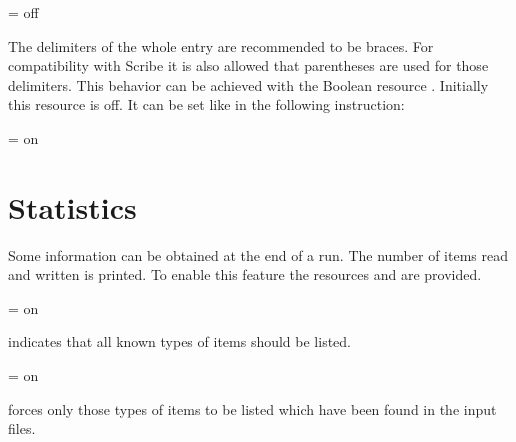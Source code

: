 \documentclass[11pt,a4paper]{scrbook}
\begin{document}
\begin{Resources}
   = off
\end{Resources}

The delimiters of the whole entry are recommended to be braces. For
compatibility with Scribe it is also allowed that parentheses are used for
those delimiters. This behavior can be achieved with the Boolean resource
. Initially this resource is off. It can be set like in
the following instruction:

\begin{Resources}
   = on
\end{Resources}


\begin{Summary}
\end{Summary}


\section{Statistics}

Some information can be obtained at the end of a \BibTool{} run. The number of
\BibTeX{} items read and written is printed. To enable this feature the
resources  and  are provided.

\begin{Resources}
   = on
\end{Resources}

 indicates that all known types of \BibTeX{} items should be
listed.

\begin{Resources}
   = on
\end{Resources}

 forces only those types of \BibTeX{} items to be listed which
have been found in the input files.


\begin{Summary}
\end{Summary}
\end{document}

